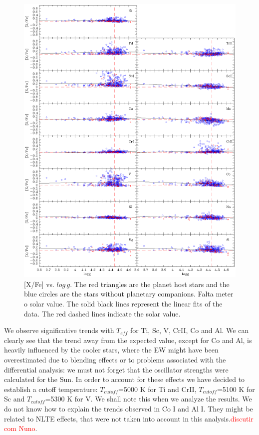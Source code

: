 \documentclass[dvips,12pt,a4paper]{report}
\begin{document}
{{\begin{figure}[h]
\centering
\includegraphics[trim=0cm 2cm 0cm 1cm,clip,width=16 cm]{pics/parte3/xfelogg.eps}
\caption[depois]{[X/Fe] vs. $log\,g$. The red triangles are the planet host stars and the blue circles are the stars without planetary companions. Falta meter o solar value. The solid black lines represent the linear fits of the data. The red dashed lines indicate the solar value.}
\label{xfelogg}
\end{figure}

We observe significative trends with $T_{eff}$ for Ti, Sc, V, CrII, Co and Al. We can clearly see that the trend away from the expected value, except for Co and Al, is heavily influenced by the cooler stars, where the EW might have been overestimated due to blending effects or to problems associated with the differential analysis: we must not forget that the oscillator strengths were calculated for the Sun. In order to account for these effects we have decided to establish a cutoff temperature: $T_{cutoff}$=5000 K for Ti and CrII, $T_{cutoff}$=5100 K for Sc and $T_{cutoff}$=5300 K for V. We shall note this when we analyze the results. We do not know how to explain the trends observed in Co I and Al I. They might be related to NLTE effects, that were not taken into account in this analysis.\textcolor{red}{discutir com Nuno}. 

}}
\end{document}
